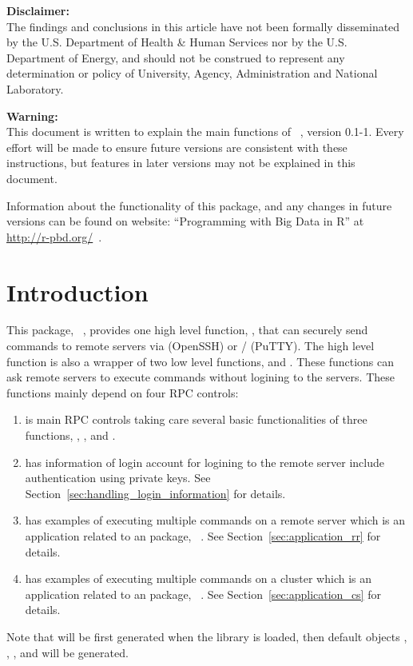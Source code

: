 
{\color{red} \bf Disclaimer:}\\
The findings and conclusions in this article have not been
formally disseminated by the U.S. Department of Health \& Human Services
nor by the U.S. Department of Energy,
and should not be construed to represent any determination or
policy of University, Agency, Administration and National Laboratory.

{\color{red} \bf Warning:}\\
This document is written to explain the main
functions of ~\citep{Chen2017pbdRPCpackage}, version 0.1-1.
Every effort will be made to ensure future versions are consistent with
these instructions, but features in later versions may not be explained
in this document.

Information about the functionality of this package,
and any changes in future versions can be found on website:
``Programming with Big Data in R'' at
\url{http://r-pbd.org/}~\citep{pbdR2012}.




\section[Introduction]{Introduction}
\label{sec:introduction}

This package, ~\citep{Chen2017pbdRPCpackage},
provides one high level function, , that can securely send
commands to remote servers via  (OpenSSH) or
/ (PuTTY).
The high level function is also a wrapper
of two low level functions,  and .
These functions can ask remote servers to execute commands without
logining to the servers.
These functions mainly depend on four RPC controls:
\begin{enumerate}
\item {} is main RPC controls taking care several basic
      functionalities of three functions, , , and
      .
\item {} has information of login account for logining to
      the remote server include authentication using private keys.
      See Section~\ref{sec:handling_login_information} for details.
\item {} has examples of executing multiple commands
      on a remote server which is an application related
      to an  package, ~\citep{remoter}. See
      Section~\ref{sec:application_rr} for details.
\item {} has examples of executing multiple commands
      on a  cluster which is an application related
      to an  package, ~\citep{pbdCS}. See
      Section~\ref{sec:application_cs} for details.
\end{enumerate}
Note that  will be first generated when the library 
is loaded, then default objects , , ,
and  will be generated.

